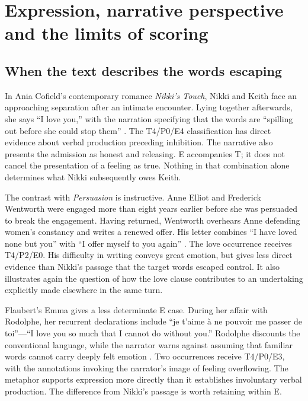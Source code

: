 \documentclass[11pt,a4paper]{article}
\begin{document}
\section{Expression, narrative perspective and the limits of scoring}

\subsection{When the text describes the words escaping}

In Ania Cofield's contemporary romance \emph{Nikki's Touch}, Nikki and Keith face an approaching separation after an intimate encounter. Lying together afterwards, she says “I love you,” with the narration specifying that the words are “spilling out before she could stop them” \citep{cofieldNikkisTouch}. The T4/P0/E4 classification has direct evidence about verbal production preceding inhibition. The narrative also presents the admission as honest and releasing. E accompanies T; it does not cancel the presentation of a feeling as true. Nothing in that combination alone determines what Nikki subsequently owes Keith.

The contrast with \emph{Persuasion} is instructive. Anne Elliot and Frederick Wentworth were engaged more than eight years earlier before she was persuaded to break the engagement. Having returned, Wentworth overhears Anne defending women's constancy and writes a renewed offer. His letter combines “I have loved none but you” with “I offer myself to you again” \citep[chap.~XXIII]{austenPersuasion}. The love occurrence receives T4/P2/E0. His difficulty in writing conveys great emotion, but gives less direct evidence than Nikki's passage that the target words escaped control. It also illustrates again the question of how the love clause contributes to an undertaking explicitly made elsewhere in the same turn.

Flaubert's Emma gives a less determinate E case. During her affair with Rodolphe, her recurrent declarations include “je t'aime à ne pouvoir me passer de toi”---“I love you so much that I cannot do without you.” Rodolphe discounts the conventional language, while the narrator warns against assuming that familiar words cannot carry deeply felt emotion \citep[part~II, chap.~XII]{flaubertBovary}. Two occurrences receive T4/P0/E3, with the annotations invoking the narrator's image of feeling overflowing. The metaphor supports expression more directly than it establishes involuntary verbal production. The difference from Nikki's passage is worth retaining within E.
\end{document}
